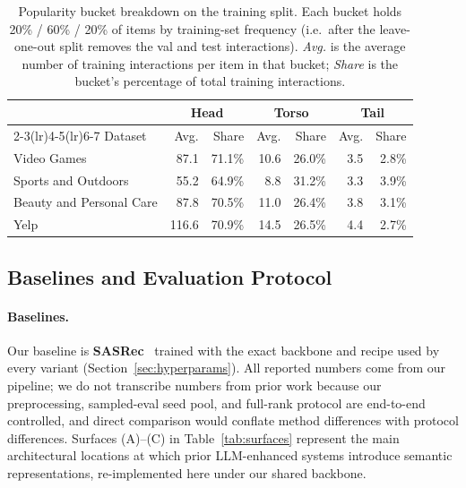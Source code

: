 \documentclass{article}
\begin{document}
\begin{table}[t]
  \centering
  \small
  \caption{Popularity bucket breakdown on the training split. Each
  bucket holds 20\% / 60\% / 20\% of items by training-set frequency
  (i.e.\ after the leave-one-out split removes the val and test
  interactions). \emph{Avg.} is the average number of training
  interactions per item in that bucket; \emph{Share} is the bucket's
  percentage of total training interactions.}
  \label{tab:popularity}
  \begin{tabular}{lrrrrrr}
    \toprule
    & \multicolumn{2}{c}{Head} & \multicolumn{2}{c}{Torso} & \multicolumn{2}{c}{Tail} \\
    \cmidrule(lr){2-3}\cmidrule(lr){4-5}\cmidrule(lr){6-7}
    Dataset & Avg. & Share & Avg. & Share & Avg. & Share \\
    \midrule
    Video Games              &  87.1 & 71.1\% & 10.6 & 26.0\% & 3.5 & 2.8\% \\
    Sports and Outdoors      &  55.2 & 64.9\% &  8.8 & 31.2\% & 3.3 & 3.9\% \\
    Beauty and Personal Care &  87.8 & 70.5\% & 11.0 & 26.4\% & 3.8 & 3.1\% \\
    Yelp                     & 116.6 & 70.9\% & 14.5 & 26.5\% & 4.4 & 2.7\% \\
    \bottomrule
  \end{tabular}
\end{table}

\subsection{Baselines and Evaluation Protocol}
\label{sec:protocol}

\paragraph{Baselines.} Our baseline is
\textbf{SASRec}~\citep{kang2018sasrec} trained with the exact
backbone and recipe used by every variant (Section~\ref{sec:hyperparams}).
All reported numbers come from our pipeline; we do not transcribe
numbers from prior work because our preprocessing, sampled-eval
seed pool, and full-rank protocol are end-to-end controlled, and
direct comparison would conflate method differences with protocol
differences. Surfaces (A)--(C) in Table~\ref{tab:surfaces}
represent the main architectural locations at which prior
LLM-enhanced systems introduce semantic representations,
re-implemented here under our shared backbone.
\end{document}
